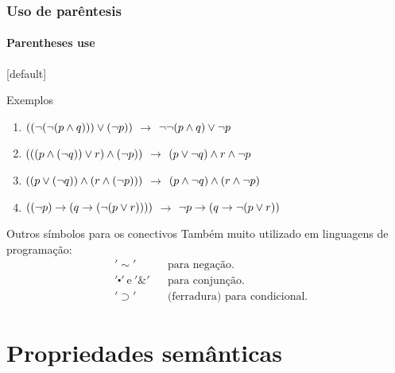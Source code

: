 %
%
\begin{frame}[t]
    \frametitle{Uso de parêntesis}
    \framesubtitle{Parentheses use}
    [default]
    \begin{exampleblock}{Exemplos}
        \begin{enumerate}[\bf 1.]
            \item $((\lnot (\lnot(p \land q))) \lor (\lnot p))$ \qquad $\longrightarrow$ \qquad $\lnot \lnot (p \land q) \lor \lnot p$
            \vspace{2mm}
            \item $(((p \land (\lnot q)) \lor r) \land (\lnot p))$ \qquad $\longrightarrow$ \qquad $(p \lor \lnot q) \land r \land \lnot p$
            \vspace{2mm}
            \item $((p \lor (\lnot q)) \land (r \land (\lnot p)))$ \qquad $\longrightarrow$ \qquad $(p \land \lnot q) \land (r \land \lnot p)$
            \vspace{2mm}
            \item $((\lnot p) \rightarrow (q \rightarrow (\lnot (p \lor r))))$ \qquad $\longrightarrow$ \qquad $\lnot p \rightarrow (q \rightarrow \lnot (p \lor r))$
        \end{enumerate}
    \end{exampleblock}
    \begin{alertblock}{Outros símbolos para os conectivos}
        Também muito utilizado em linguagens de programação:
        \vspace{-2mm}
        \begin{align*}
            &' \sim '                      &     & \text{para negação.}  \\
            &' \centerdot '~\text{e}~'\&'  &     & \text{para conjunção.} \\
            &' \supset '                   &     & \text{(ferradura) para condicional.} 
        \end{align*}
    \end{alertblock}
\end{frame}

\section{Propriedades semânticas}
%
